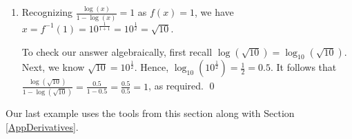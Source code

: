 \begin{ex}
\begin{enumerate}
\begin{center}
\end{center}

\item Recognizing   $\frac{\log(x)}{1-\log(x)} = 1$ as $f(x) = 1$, we have $x = f^{-1}(1) = 10^{\frac{1}{1+1}} = 10^{\frac{1}{2}} = \sqrt{10}$.

To check our answer algebraically,  first recall  $\log(\sqrt{10}) = \log_{10}(\sqrt{10})$.  Next, we know $\sqrt{10} = 10^{\frac{1}{2}}$.  Hence, $\log_{10} \left(10^{\frac{1}{2}} \right) = \frac{1}{2} = 0.5$.  It follows that $\frac{\log(\sqrt{10})}{1-\log(\sqrt{10})} = \frac{0.5}{1-0.5} = \frac{0.5}{0.5} = 1$, as required.  \qed

\end{enumerate}

\end{ex}

\pagebreak

Our last example uses the tools from this section along with Section \ref{AppDerivatives}.

